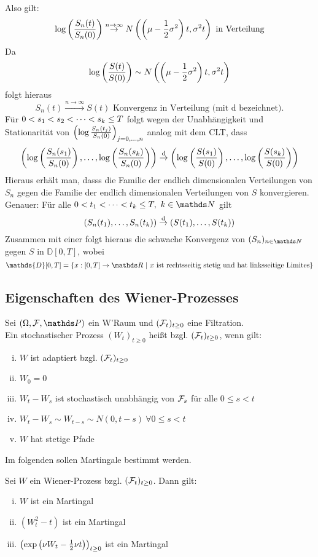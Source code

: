 Also gilt:
\[
\log\left( \frac{S_n(t)}{S_n(0)}\right)\stackrel{n\to\infty}{\to} N\left( \left( \mu-\frac{1}{2}\sigma^2\right)t,\sigma^2t\right)\text{ in Verteilung}
\]
Da 
\[
\log\left( \frac{S(t)}{S(0)}\right)\sim N\left( \left( \mu-\frac{1}{2}\sigma^2\right)t,\sigma^2t\right)
\]
folgt hieraus
\[
S_n(t)\stackrel{n\to\infty}{\to}S(t)\text{ Konvergenz in Verteilung (mit d bezeichnet).}
\]
Für $0<s_1<s_2< \dots <s_k\le T$ folgt wegen der Unabhängigkeit und Stationarität von $\left( \log\frac{S_n(t_j)}{S_n(0)}\right)_{j=0, \dots ,n}$ analog mit dem CLT, dass
\[
\left( \log\left( \frac{S_n(s_1)}{S_n(0)}\right), \dots ,\log\left( \frac{S_n(s_k)}{S_n(0)}\right)\right)\stackrel{\text{d}}{\to}\left( \log\left( \frac{S(s_1)}{S(0)}\right), \dots ,\log\left( \frac{S(s_k)}{S(0)}\right)\right)
\]
Hieraus erhält man, dasss die Familie der endlich dimensionalen Verteilungen von $S_n$ gegen die Familie der endlich dimensionalen Verteilungen von $S$ konvergieren.
Genauer: Für alle $0<t_1\dt{<}t_k\le T,~k\in \N$ gilt
\[
\left( S_n(t_1), \dots ,S_n(t_k)\right)\stackrel{\text{d}}{\to}\left( S(t_1), \dots ,S(t_k)\right)
\]
Zusammen mit einer  folgt hieraus die schwache Konvergenz von $(S_n)_{n\in \N}$ gegen $S$ in $\mathds{D}[0,T]$, wobei
\[
\mathds{D}[0,T]=\penbrace{x:[0,T]\to\R~|~x \text{ ist rechtsseitig stetig und hat linksseitige Limites}}
\]

\subsection{Eigenschaften des Wiener-Prozesses}
\label{sub:eig_weiner-prozess}
Sei $(\Omega,\F,\Pw)$ ein W'Raum und $(\mathcal{F}_t)_{t\ge0}$ eine Filtration.\\
Ein stochastischer Prozess $(W_t)_{t\ge0}$ heißt  bzgl. $(\mathcal{F}_t)_{t\ge0}$, wenn gilt:
\begin{enumerate}[(i)]
	\item $W$ ist adaptiert bzgl. $(\mathcal{F}_t)_{t\ge0}$
	\item $W_0=0$ \Pfs
	\item $W_t-W_s$ ist stochastisch unabhängig von $\mathcal{F}_s$ für alle $0\le s<t$
	\item $W_t-W_s\sim W_{t-s}\sim N(0,t-s)~\forall 0\le s<t$
	\item $W$ hat \Pfs stetige Pfade
\end{enumerate}
Im folgenden sollen Martingale bestimmt werden.

Sei $W$ ein Wiener-Prozess bzgl. $(\mathcal{F}_t)_{t\ge0}$.
Dann gilt:
\begin{enumerate}[(i)]
	\item $W$ ist ein Martingal
	\item $(W_t^2-t)$ ist ein Martingal
	\item $\left( \exp\left( \nu W_t-\frac{1}{2}\nu t\right)\right)_{t\ge 0}$ ist ein Martingal
\end{enumerate}

